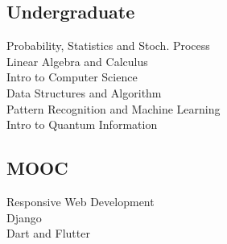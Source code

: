 \documentclass{deedy-resume-openfont}
\begin{document}
\begin{minipage}[t]{0.33\textwidth}
\subsection{Undergraduate}
Probability, Statistics and Stoch. Process \\
Linear Algebra and Calculus \\
Intro to Computer Science \\
Data Structures and Algorithm\\
Pattern Recognition and Machine Learning\\
Intro to Quantum Information\\

\sectionsep

\subsection{MOOC}
Responsive Web Development\\
Django \\
Dart and Flutter \\
\sectionsep 


%
%

\end{minipage} 
\hfill
\end{document}
